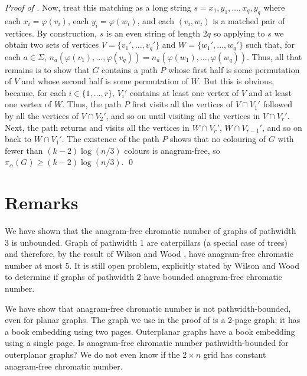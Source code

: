 \documentclass{llncs}
\begin{document}
\begin{proof}[Proof of ]
Now, treat this matching as a long string $s=x_1,y_1,\ldots,x_q,y_q$
where each $x_i=\varphi(v_i)$, each $y_i=\varphi(w_i)$, and each
$(v_i,w_i)$ is a matched pair of vertices.  
By construction, $s$ is an even string of length $2q$ so
applying
 to $s$ we obtain two sets of vertices
$V=\{v_1',\ldots,v_q'\}$ and $W=\{w_1',\ldots,w_q'\}$ such that, 
for each $a\in\Sigma$,
$n_a(\varphi(v_1),\ldots,\varphi(v_q))=n_a(\varphi(w_1),\ldots,\varphi(w_q))$.
Thus, all that remains is to show that $G$ contains a path $P$ whose first
half is some permutation of $V$ and whose second half
is some permutation of $W$.  But this is obvious, because,
for each $i\in\{1,\ldots,r\}$, $V_i'$ contains at least one vertex of $V$
and at least one vertex of $W$.  Thus, the path $P$ first visits all the
vertices of $V\cap V_1'$ followed by all the vertices of $V\cap V_2'$,
and so on until visiting all the vertices in $V\cap V_r'$. Next, the path
returns and visits all the vertices in $W\cap V_r'$, $W\cap V_{r-1}'$,
and so on back to $W\cap V_1'$.  The existence of the path $P$ shows
that no colouring of $G$ with fewer than $(k-2)\log(n/3)$ colours is anagram-free, so $\pi_\alpha(G) \ge (k-2)\log(n/3)$.
\qed
\end{proof}

\section{Remarks}

We have shown that the anagram-free chromatic number of graphs of
pathwidth 3 is unbounded. Graph of pathwidth 1 are caterpillars (a
special case of trees) and therefore, by the result of Wilson and
Wood \cite{wilson.wood:anagram-free}, have anagram-free chromatic number at
most 5.  It is still open problem, explicitly stated by Wilson and Wood
to determine if graphs of pathwidth 2 have bounded
anagram-free chromatic number.

We have show that anagram-free chromatic number is not pathwidth-bounded,
even for planar graphs.  The graph we use in the proof of 
is a 2-page graph; it has a book embedding using two pages.  Outerplanar
graphs have a book embedding using a single page.  Is anagram-free
chromatic number pathwidth-bounded for outerplanar graphs?  We do not even know if the $2\times n$ grid has constant anagram-free chromatic number.




\end{document}
